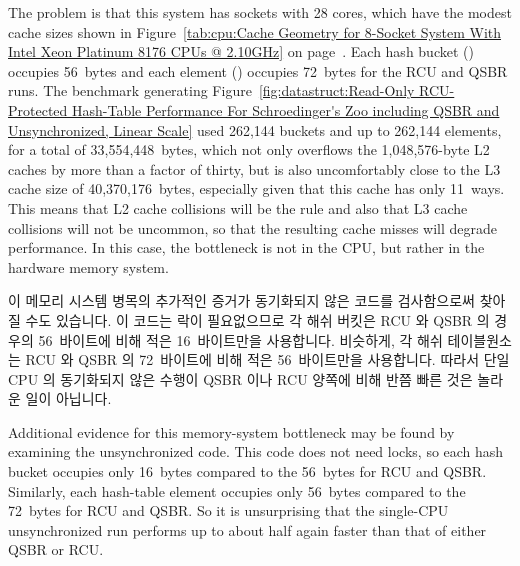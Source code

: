 The problem is that this system has sockets with 28 cores, which have
the modest cache sizes shown in
Figure~\ref{tab:cpu:Cache Geometry for 8-Socket System With Intel Xeon Platinum 8176 CPUs @ 2.10GHz}
on page~\pageref{tab:cpu:Cache Geometry for 8-Socket System With Intel Xeon Platinum 8176 CPUs @ 2.10GHz}.
Each hash bucket () occupies 56~bytes and each
element () occupies 72~bytes for the RCU and QSBR runs.
The benchmark generating
Figure~\ref{fig:datastruct:Read-Only RCU-Protected Hash-Table Performance For Schroedinger's Zoo including QSBR and Unsynchronized, Linear Scale}
used 262,144 buckets and up to 262,144 elements, for a total of
33,554,448~bytes, which not only overflows the 1,048,576-byte L2 caches
by more than a factor of thirty, but is also uncomfortably close to the
L3 cache size of 40,370,176~bytes, especially given that this cache has
only 11~ways.
This means that L2 cache collisions will be the rule and also that L3
cache collisions will not be uncommon, so that the resulting cache misses
will degrade performance.
In this case, the bottleneck is not in the CPU, but rather in the hardware
memory system.

\fi

이 메모리 시스템 병목의 추가적인 증거가 동기화되지 않은 코드를 검사함으로써
찾아질 수도 있습니다.
이 코드는 락이 필요없으므로 각 해쉬 버킷은 RCU 와 QSBR 의 경우의 56~바이트에
비해 적은 16~바이트만을 사용합니다.
비슷하게, 각 해쉬 테이블원소는 RCU 와 QSBR 의 72~바이트에 비해 적은
56~바이트만을 사용합니다.
따라서 단일 CPU 의 동기화되지 않은 수행이 QSBR 이나 RCU 양쪽에 비해 반쯤 빠른
것은 놀라운 일이 아닙니다.

\iffalse

Additional evidence for this memory-system bottleneck may be found by
examining the unsynchronized code.
This code does not need locks, so each hash bucket occupies only 16~bytes
compared to the 56~bytes for RCU and QSBR\@.
Similarly, each hash-table element occupies only 56~bytes compared to the
72~bytes for RCU and QSBR\@.
So it is unsurprising that the single-CPU unsynchronized run performs up
to about half again faster than that of either QSBR or RCU\@.

